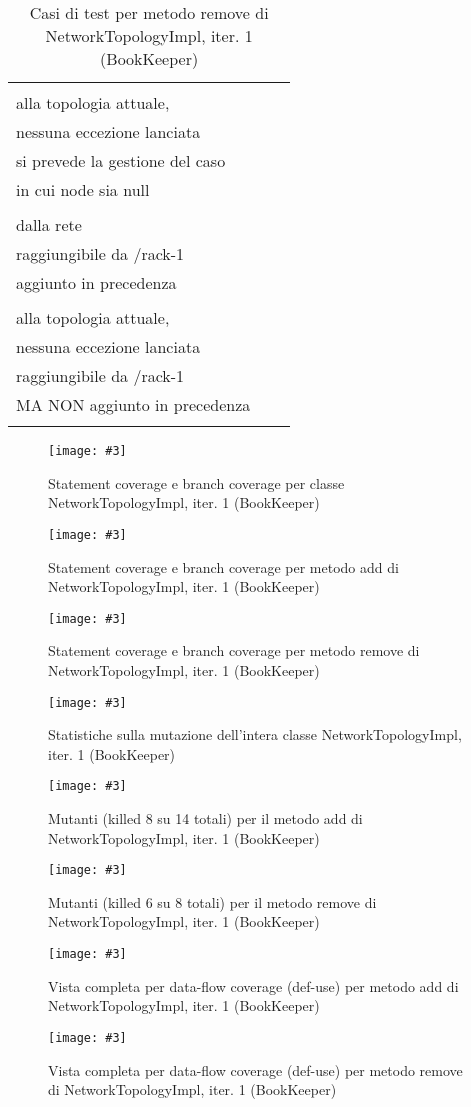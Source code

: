 \documentclass[10pt, a4paper]{article}
\newcommand{\Intmaketable}[4]{
	\begin{longtable}{#3}
	#4
	\caption{#2}
	\label{#1}
	\end{longtable}
}
\newcommand{\Inttestctable}[3]{
	\Intmaketable{#1}{#2}{|l|l|l|}{
	\hline
	\thead{Input} & \thead{Esito atteso} & \thead{Motivazione}\\
	\hline
	\hline
	#3
	\hline}
}
\newcommand{\Inttestccaption}[4]{Casi di test per metodo #1 di #2, iter. #3 (#4)}
\newcommand{\gettablelabel}[5]{table:#1:#2:#3:iter#4:proj#5}
\newcommand{\testctable}[5]{
	\Inttestctable{\gettablelabel{testc}{#1}{#2}{#3}{#4}}
		{\Inttestccaption{#1}{#2}{#3}{#4}}
		{#5}
}
\newcommand{\getpicturelabel}[1]{picture:#1}
\newcommand{\makepicture}[4]{
	\begin{figure}[H]
	\centering
	\texttt{[image: \#3]}
	\caption{#4}
	\label{\getpicturelabel{#3}}
	\end{figure}
}
\newcommand{\alldfcovcaption}[4]{Vista completa per data-flow coverage (def-use) per metodo #1 di #2, iter. #3 (#4)}
\newcommand{\methodcfcovcaption}[4]{Statement coverage e branch coverage per metodo #1 di #2, iter. #3 (#4)}
\newcommand{\classcfcovcaption}[3]{Statement coverage e branch coverage per classe #1, iter. #2 (#3)}
\newcommand{\mutclasscaption}[3]{Statistiche sulla mutazione dell'intera classe #1, iter. #2 (#3)}
\newcommand{\mutmethodcaption}[6]{Mutanti (killed #5 su #6 totali) per il metodo #1 di #2, iter. #3 (#4)}
\newcommand{\tcell}{\makecell[tl]}
\newcommand{\newtrow}{\\ \hline}
\def\bookkeeper{BookKeeper}
\begin{document}
	\testctable{remove}{NetworkTopologyImpl}{1}{\bookkeeper}{
			\tcell{null} & \tcell{Nessuna variazione rispetto\\ alla topologia attuale,\\ nessuna 
			eccezione lanciata} & \tcell{Specifica della documentazione:\\ si prevede la gestione del 
			caso\\ in cui node sia null}
		\newtrow
			\tcell{buildNode("/rack-1","bookie-1")} & \tcell{Rimozione con successo del nodo\\ dalla rete} & \tcell{Il nodo è una foglia (un server bk)\\ raggiungibile da /rack-1\\ aggiunto in precedenza}
		\newtrow
			\tcell{buildNode("/rack-1","bookie-2")} & \tcell{Nessuna variazione rispetto\\ alla topologia attuale,\\ nessuna eccezione lanciata} & \tcell{Il nodo è una foglia (un server bk)\\ raggiungibile da /rack-1\\ MA NON aggiunto in precedenza}
		\newtrow
	}	
	
	\makepicture{17cm}{1.15cm}{bk/controlflow-NetworkTopologyImpl-1}
				{\classcfcovcaption{NetworkTopologyImpl}{1}{\bookkeeper}}
				
	\makepicture{17cm}{0.75cm}{bk/controlflow-add-NetworkTopologyImpl-1}
				{\methodcfcovcaption{add}{NetworkTopologyImpl}{1}{\bookkeeper}}
				
	\makepicture{17cm}{0.75cm}{bk/controlflow-remove-NetworkTopologyImpl-1}
				{\methodcfcovcaption{remove}{NetworkTopologyImpl}{1}{\bookkeeper}}
				
	\makepicture{17cm}{1.5cm}{bk/mutation-NetworkTopologyImpl-1}
				{\mutclasscaption{NetworkTopologyImpl}{1}{\bookkeeper}}
				
	\makepicture{17cm}{15cm}{bk/mutation-add-NetworkTopologyImpl-1}
				{\mutmethodcaption{add}{NetworkTopologyImpl}{1}{\bookkeeper}{8}{14}}
	
	\makepicture{17cm}{10cm}{bk/mutation-remove-NetworkTopologyImpl-1}
				{\mutmethodcaption{remove}{NetworkTopologyImpl}{1}{\bookkeeper}{6}{8}}
				
	\makepicture{13cm}{23cm}{bk/dataflow-add-NetworkTopologyImpl-1}
				{\alldfcovcaption{add}{NetworkTopologyImpl}{1}{\bookkeeper}}
				
	\makepicture{13cm}{15cm}{bk/dataflow-remove-NetworkTopologyImpl-1}
				{\alldfcovcaption{remove}{NetworkTopologyImpl}{1}{\bookkeeper}}
				
\end{document}
